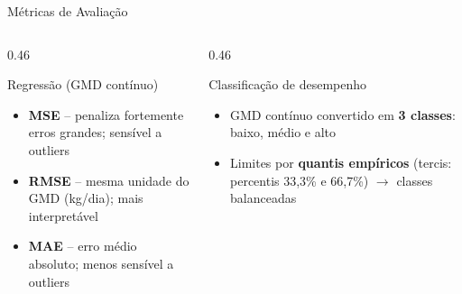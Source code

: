 \documentclass[aspectratio=1610]{beamer}
\begin{document}

\begin{frame}{Métricas de Avaliação}
\begin{columns}[t]
\begin{column}{0.46\linewidth}
  \begin{block}{Regressão (GMD contínuo)}
    \begin{itemize} \itemsep0.4em
      \item \textbf{MSE} -- penaliza fortemente erros grandes; sensível a outliers
      \item \textbf{RMSE} -- mesma unidade do GMD (kg/dia); mais interpretável
      \item \textbf{MAE} -- erro médio absoluto; menos sensível a outliers
    \end{itemize}
  \end{block}
\end{column}
\begin{column}{0.46\linewidth}
  \begin{block}{Classificação de desempenho}
    \begin{itemize} \itemsep0.4em
      \item GMD contínuo convertido em \textbf{3 classes}: baixo, médio e alto
      \item Limites por \textbf{quantis empíricos} (tercis: percentis 33,3\% e 66,7\%) $\rightarrow$ classes balanceadas
    \end{itemize}
  \end{block}
\end{column}
\end{columns}
\end{frame}

\end{document}
